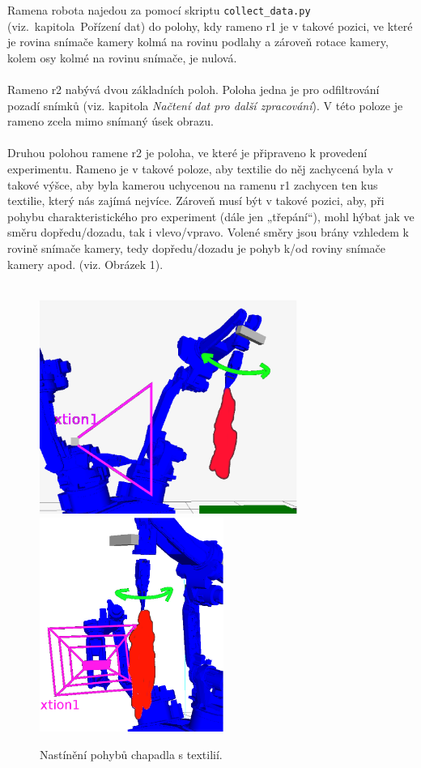 \documentclass[10pt,a4paper,titlepage,oneside]{report}
\begin{document}
Ramena robota najedou za pomocí skriptu \verb|collect_data.py| (viz.~kapitola~Pořízení dat) do polohy, kdy rameno r1 je v takové pozici, ve které je rovina snímače kamery kolmá na rovinu podlahy a zároveň rotace kamery, kolem osy kolmé na rovinu snímače, je nulová.\\
\\
Rameno r2 nabývá dvou základních poloh. Poloha jedna je pro odfiltrování pozadí snímků (viz. kapitola \textit{Načtení dat pro další zpracování}). V této poloze je rameno zcela mimo snímaný úsek obrazu.\\
\\ 
Druhou polohou ramene r2 je poloha, ve které je připraveno k provedení experimentu. Rameno je v takové poloze, aby textilie do něj zachycená byla v takové výšce, aby byla kamerou uchycenou na ramenu r1 zachycen ten kus textilie, který nás zajímá nejvíce. Zároveň musí být v takové pozici, aby, při pohybu charakteristického pro experiment (dále jen „třepání“), mohl hýbat jak ve směru dopředu/dozadu, tak i vlevo/vpravo. Volené směry jsou brány vzhledem k rovině snímače kamery, tedy dopředu/dozadu je pohyb k/od roviny snímače kamery apod. (viz. Obrázek 1).\\
\\
\begin{figure}[H]
	\centering  	
  	\includegraphics[height=7cm]{pictures/move2.eps}
  	\includegraphics[height=7cm]{pictures/move1.eps}
  	\caption{Nastínění pohybů chapadla s textilií.}
  	\label{fig:obrazek1}
\end{figure}
\end{document}
